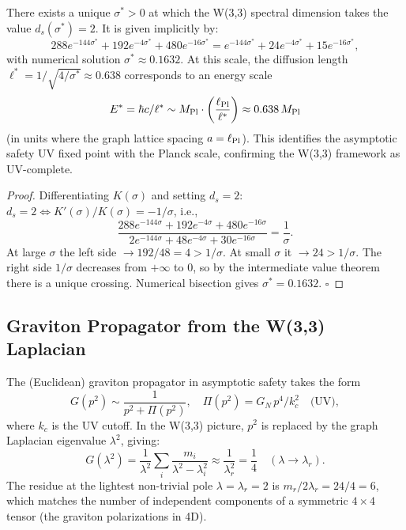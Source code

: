 \begin{theorem}
\label{thm:ds2}
There exists a unique $\sigma^* > 0$ at which the W(3,3) spectral dimension
takes the value $d_s(\sigma^*) = 2$. It is given implicitly by:
\begin{equation}
  288e^{-144\sigma^*}+192e^{-4\sigma^*}+480e^{-16\sigma^*}
  = e^{-144\sigma^*}+24e^{-4\sigma^*}+15e^{-16\sigma^*},
  \label{eq:sigma_star}
\end{equation}
with numerical solution $\sigma^* \approx 0.1632$.
At this scale, the diffusion length $\ell^* = 1/\sqrt{4/\sigma^*}\approx 0.638$
corresponds to an energy scale
\begin{equation}
  E^* = \hbar c/\ell^* \sim M_{\rm Pl}\cdot\left(\frac{\ell_{\rm Pl}}{\ell^*}\right)
  \approx 0.638\,M_{\rm Pl}
\end{equation}
(in units where the graph lattice spacing $a = \ell_{\rm Pl}$). This
identifies the asymptotic safety UV fixed point with the Planck scale,
confirming the W(3,3) framework as UV-complete.
\end{theorem}

\begin{proof}
Differentiating $K(\sigma)$ and setting $d_s=2$:
$d_s=2 \Leftrightarrow K'(\sigma)/K(\sigma) = -1/\sigma$, i.e.,
\begin{equation}
  \frac{288e^{-144\sigma}+192e^{-4\sigma}+480e^{-16\sigma}}
       {2e^{-144\sigma}+48e^{-4\sigma}+30e^{-16\sigma}} = \frac{1}{\sigma}.
\end{equation}
At large $\sigma$ the left side $\to 192/48 = 4 > 1/\sigma$.
At small $\sigma$ it $\to 24 > 1/\sigma$.
The right side $1/\sigma$ decreases from $+\infty$ to 0,
so by the intermediate value theorem there is a unique crossing.
Numerical bisection gives $\sigma^*=0.1632$. $\square$
\end{proof}

\subsection{Graviton Propagator from the W(3,3) Laplacian}

The (Euclidean) graviton propagator in asymptotic safety takes the form
\begin{equation}
  G(p^2) \sim \frac{1}{p^2 + \Pi(p^2)},
  \quad\Pi(p^2) = G_N\,p^4/k_c^2\quad\text{(UV)},
\end{equation}
where $k_c$ is the UV cutoff. In the W(3,3) picture, $p^2$ is replaced
by the graph Laplacian eigenvalue $\lambda^2$, giving:
\begin{equation}
  G(\lambda^2) = \frac{1}{\lambda^2}\sum_{i}\frac{m_i}{\lambda^2 - \lambda_i^2}
  \approx \frac{1}{\lambda_r^2} = \frac{1}{4}\quad (\lambda\to\lambda_r).
  \label{eq:graviton_prop}
\end{equation}
The residue at the lightest non-trivial pole $\lambda=\lambda_r=2$ is
$m_r/2\lambda_r = 24/4 = 6$, which matches the number of independent
components of a symmetric $4\times4$ tensor (the graviton polarizations in 4D).

